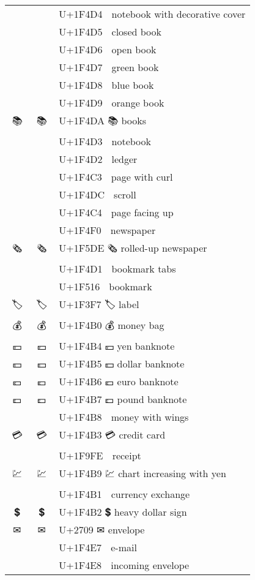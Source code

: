 \documentclass[a4paper,12pt]{ltjarticle}
\newcommand{\fontA}[1]{{\fontspec[RawFeature={mode=harf,+dist,+ccmp}]{Segoe UI Emoji} #1}}
\newcommand{\fontB}[1]{{\fontspec[RawFeature={mode=harf,+dist,+ccmp}]{Noto Color Emoji} #1}}
\begin{document}
\begin{longtable}[c]{ccp{0.8\linewidth}}
\fontA{📔}&\fontB{📔}&U+1F4D4 📔 notebook with decorative cover\\
\fontA{📕}&\fontB{📕}&U+1F4D5 📕 closed book\\
\fontA{📖}&\fontB{📖}&U+1F4D6 📖 open book\\
\fontA{📗}&\fontB{📗}&U+1F4D7 📗 green book\\
\fontA{📘}&\fontB{📘}&U+1F4D8 📘 blue book\\
\fontA{📙}&\fontB{📙}&U+1F4D9 📙 orange book\\
\fontA{📚}&\fontB{📚}&U+1F4DA 📚 books\\
\fontA{📓}&\fontB{📓}&U+1F4D3 📓 notebook\\
\fontA{📒}&\fontB{📒}&U+1F4D2 📒 ledger\\
\fontA{📃}&\fontB{📃}&U+1F4C3 📃 page with curl\\
\fontA{📜}&\fontB{📜}&U+1F4DC 📜 scroll\\
\fontA{📄}&\fontB{📄}&U+1F4C4 📄 page facing up\\
\fontA{📰}&\fontB{📰}&U+1F4F0 📰 newspaper\\
\fontA{🗞}&\fontB{🗞}&U+1F5DE 🗞 rolled-up newspaper\\
\fontA{📑}&\fontB{📑}&U+1F4D1 📑 bookmark tabs\\
\fontA{🔖}&\fontB{🔖}&U+1F516 🔖 bookmark\\
\fontA{🏷}&\fontB{🏷}&U+1F3F7 🏷 label\\
\fontA{💰}&\fontB{💰}&U+1F4B0 💰 money bag\\
\fontA{💴}&\fontB{💴}&U+1F4B4 💴 yen banknote\\
\fontA{💵}&\fontB{💵}&U+1F4B5 💵 dollar banknote\\
\fontA{💶}&\fontB{💶}&U+1F4B6 💶 euro banknote\\
\fontA{💷}&\fontB{💷}&U+1F4B7 💷 pound banknote\\
\fontA{💸}&\fontB{💸}&U+1F4B8 💸 money with wings\\
\fontA{💳}&\fontB{💳}&U+1F4B3 💳 credit card\\
\fontA{🧾}&\fontB{🧾}&U+1F9FE 🧾 receipt\\
\fontA{💹}&\fontB{💹}&U+1F4B9 💹 chart increasing with yen\\
\fontA{💱}&\fontB{💱}&U+1F4B1 💱 currency exchange\\
\fontA{💲}&\fontB{💲}&U+1F4B2 💲 heavy dollar sign\\
\fontA{✉}&\fontB{✉}&U+2709 ✉ envelope\\
\fontA{📧}&\fontB{📧}&U+1F4E7 📧 e-mail\\
\fontA{📨}&\fontB{📨}&U+1F4E8 📨 incoming envelope\\

\end{longtable}
\end{document}

